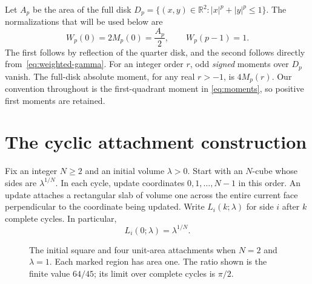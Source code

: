 \documentclass[11pt]{article}
\numberwithin{equation}{section}
\theoremstyle{remark}
\newcommand{\R}{\mathbb{R}}
\begin{document}
Let $A_p$ be the area of the full disk
$D_p=\{(x,y)\in\R^2:|x|^p+|y|^p\leq1\}$.
The normalizations that will be used below are
\begin{equation}
  W_p(0)=2M_p(0)=\frac{A_p}{2},
  \qquad
  W_p(p-1)=1.
  \label{eq:normalization}
\end{equation}
The first follows by reflection of the quarter disk, and the second
follows directly from~\eqref{eq:weighted-gamma}.
For an integer order $r$, odd \emph{signed} moments over $D_p$ vanish.
The full-disk absolute moment, for any real $r>-1$, is $4M_p(r)$.
Our convention throughout is the first-quadrant moment in
\eqref{eq:moments}, so positive first moments are retained.

\section{The cyclic attachment construction}
\label{sec:construction}

Fix an integer $N\geq2$ and an initial volume $\lambda>0$.
Start with an $N$-cube whose sides are $\lambda^{1/N}$.
In each cycle, update coordinates $0,1,\ldots,N-1$ in this order.
An update attaches a rectangular slab of volume one across the
entire current face perpendicular to the coordinate being updated.
Write $L_i(k;\lambda)$ for side $i$ after $k$ complete cycles.
In particular,
\[
  L_i(0;\lambda)=\lambda^{1/N}.
\]

\begin{figure}[htbp]
\centering
{}
\caption{The initial square and four unit-area attachments when $N=2$
and $\lambda=1$. Each marked region has area one. The ratio shown is
the finite value $64/45$; its limit over complete cycles is $\pi/2$.}
\label{fig:attachments}
\end{figure}
\end{document}
